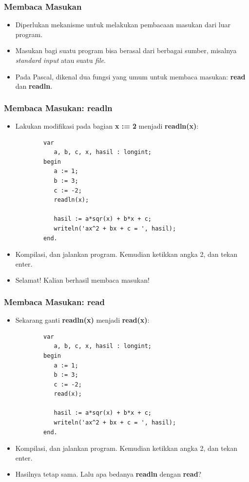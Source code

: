 \documentclass{beamer}
\begin{document}
\begin{frame}
\frametitle{Membaca Masukan}
\begin{itemize}
    \item Diperlukan mekanisme untuk melakukan pembacaan masukan dari luar program.
    \item Masukan bagi suatu program bisa berasal dari berbagai sumber, misalnya \textit{standard input} atau suatu \textit{file}.
    \item Pada Pascal, dikenal dua fungsi yang umum untuk membaca masukan: \alert{\textbf{read}} dan \alert{\textbf{readln}}.
\end{itemize}
\end{frame}

\begin{frame}[fragile]
\frametitle{Membaca Masukan: readln}
\begin{itemize}
    \item Lakukan modifikasi pada bagian \textbf{x := 2} menjadi \textbf{readln(x)}:
    \begin{lstlisting}
        var
           a, b, c, x, hasil : longint;
        begin
           a := 1;
           b := 3;
           c := -2;
           readln(x);

           hasil := a*sqr(x) + b*x + c;
           writeln('ax^2 + bx + c = ', hasil);
        end.
    \end{lstlisting}
    \item Kompilasi, dan jalankan program. Kemudian ketikkan angka 2, dan tekan enter.
    \item Selamat! Kalian berhasil membaca masukan!
\end{itemize}
\end{frame}

\begin{frame}[fragile]
\frametitle{Membaca Masukan: read}
\begin{itemize}
    \item Sekarang ganti \textbf{readln(x)} menjadi \textbf{read(x)}:
    \begin{lstlisting}
        var
           a, b, c, x, hasil : longint;
        begin
           a := 1;
           b := 3;
           c := -2;
           read(x);

           hasil := a*sqr(x) + b*x + c;
           writeln('ax^2 + bx + c = ', hasil);
        end.
    \end{lstlisting}
    \item Kompilasi, dan jalankan program. Kemudian ketikkan angka 2, dan tekan enter.
    \item Hasilnya tetap sama. Lalu apa bedanya \textbf{readln} dengan \textbf{read}?
\end{itemize}
\end{frame}
\end{document}
